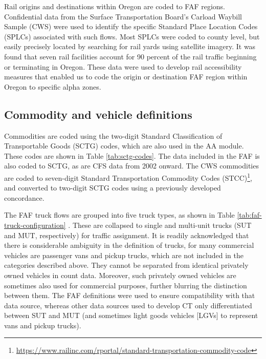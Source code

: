 Rail origins and destinations within Oregon are coded to FAF regions. Confidential data from the Surface Transportation Board's Carload Waybill Sample (CWS) were used to identify the specific Standard Place Location Codes (SPLCs) associated with such flows. Most SPLCs were coded to county level, but easily precisely located by searching for rail yards using satellite imagery. It was found that seven rail facilities account for 90 percent of the rail traffic beginning or terminating in Oregon. These data were used to develop rail accessibility measures that enabled us to code the origin or destination FAF region within Oregon to specific alpha zones.

\subsection{Commodity and vehicle definitions}\label{sec:ct-commodity-truck-def}

Commodities are coded using the two-digit Standard Classification of Transportable Goods (SCTG) codes, which are also used in the AA module. These codes are shown in Table \ref{tab:sctg-codes}. The data included in the FAF is also coded to SCTG, as are CFS data from 2002 onward. The CWS commodities are coded to seven-digit Standard Transportation Commodity Codes (STCC)\footnote{\url{https://www.railinc.com/rportal/standard-transportation-commodity-code}}, and converted to two-digit SCTG codes using a previously developed concordance.



The FAF truck flows are grouped into five truck types, as shown in Table \ref{tab:faf-truck-configuration} \citep{battelle11}. These are collapsed to single and multi-unit trucks (SUT and MUT, respectively) for traffic assignment. It is readily acknowledged that there is considerable ambiguity in the definition of trucks, for many commercial vehicles are passenger vans and pickup trucks, which are not included in the categories described above. They cannot be separated from identical privately owned vehicles in count data. Moreover, such privately owned vehicles are sometimes also used for commercial purposes, further blurring the distinction between them. The FAF definitions were used to ensure compatibility with that data source, whereas other data sources used to develop CT only differentiated between SUT and MUT (and sometimes light goods vehicles [LGVs] to represent vans and pickup trucks).

